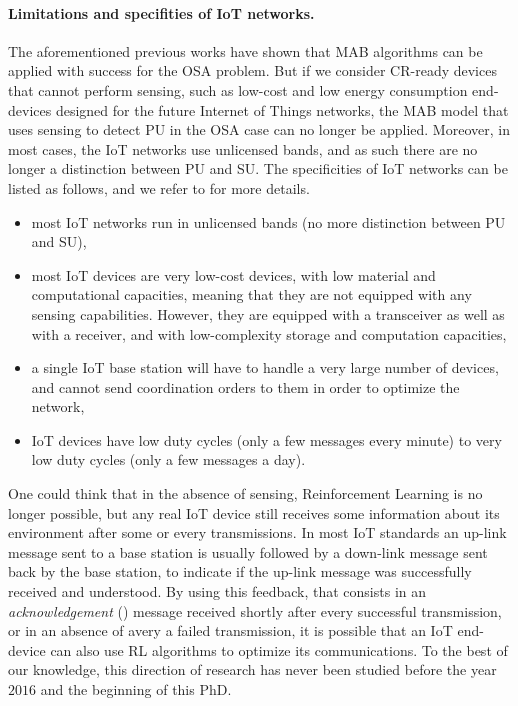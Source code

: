 

\paragraph{Limitations and specifities of IoT networks.}
%
The aforementioned previous works have shown that MAB algorithms can be applied with success for the OSA problem.
But if we consider CR-ready devices that cannot perform sensing, such as low-cost and low energy consumption end-devices designed for the future Internet of Things networks, the MAB model that uses sensing to detect PU in the OSA case can no longer be applied.
Moreover, in most cases, the IoT networks use unlicensed bands, and as such there are no longer a distinction between PU and SU.
%
The specificities of IoT networks can be listed as follows,
and we refer to \cite{Centenaro16} for more details.
\begin{itemize}\tightlist
    \item
    most IoT networks run in unlicensed bands (no more distinction between PU and SU),
    \item
    most IoT devices are very low-cost devices, with low material and computational capacities,
    meaning that they are not equipped with any sensing capabilities.
    However, they are equipped with a transceiver as well as with a receiver,
    and with low-complexity storage and computation capacities,
    \item
    a single IoT base station will have to handle a very large number of devices,
    and cannot send coordination orders to them in order to optimize the network,
    \item
    IoT devices have low duty cycles (only a few messages every minute) to very low duty cycles (only a few messages a day).
\end{itemize}

One could think that in the absence of sensing, Reinforcement Learning is no longer possible, but any real IoT device still receives some information about its environment after some or every transmissions.
In most IoT standards an up-link message sent to a base station is usually followed by a down-link message sent back by the base station, to indicate if the up-link message was successfully received and understood.
%
By using this feedback, that consists in an \emph{acknowledgement} (\Ack) message received shortly after every successful transmission, or in an absence of \Ack{} avery a failed transmission, it is possible that an IoT end-device can also use RL algorithms to optimize its communications.
%
To the best of our knowledge, this direction of research has never been studied before the year $2016$ and the beginning of this PhD.

